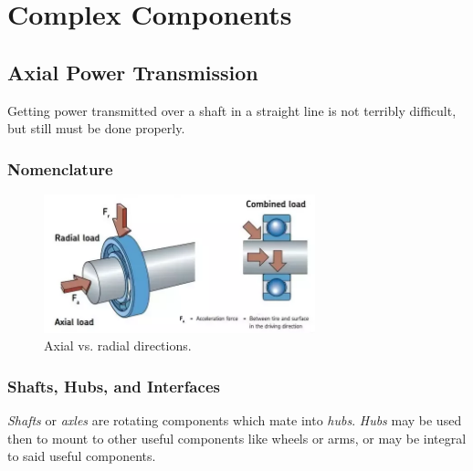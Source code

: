 \documentclass[10pt,letterpaper]{book}
\begin{document}
\chapter{Complex Components}

\section{Axial Power Transmission}

Getting power transmitted over a shaft in a straight line is not terribly difficult, but still must be done properly.

\subsection{Nomenclature}

\begin{figure}[H]
\includegraphics[width=0.7\textwidth]{imgs/radial_axial.png}
\caption{Axial vs. radial directions.}
\end{figure}

\subsection{Shafts, Hubs, and Interfaces}
	
	\textit{Shafts} or \textit{axles} are rotating components which mate into \textit{hubs}. \textit{Hubs} may be used then to mount to other useful components like wheels or arms, or may be integral to said useful components.
\end{document}
